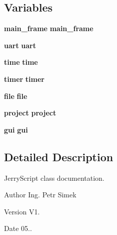 \subsection*{Variables}
\begin{DoxyCompactItemize}
\item 
\textbf{ main\+\_\+frame} {\bfseries main\+\_\+frame}
\item 
\textbf{ uart} {\bfseries uart}
\item 
\textbf{ time} {\bfseries time}
\item 
\textbf{ timer} {\bfseries timer}
\item 
\textbf{ file} {\bfseries file}
\item 
\textbf{ project} {\bfseries project}
\item 
\textbf{ gui} {\bfseries gui}
\end{DoxyCompactItemize}


\subsection{Detailed Description}
Jerry\+Script class documentation. 

\begin{DoxyAuthor}{Author}
Ing. Petr Simek 
\end{DoxyAuthor}
\begin{DoxyVersion}{Version}
V1. 
\end{DoxyVersion}
\begin{DoxyDate}{Date}
05.. 
\end{DoxyDate}
